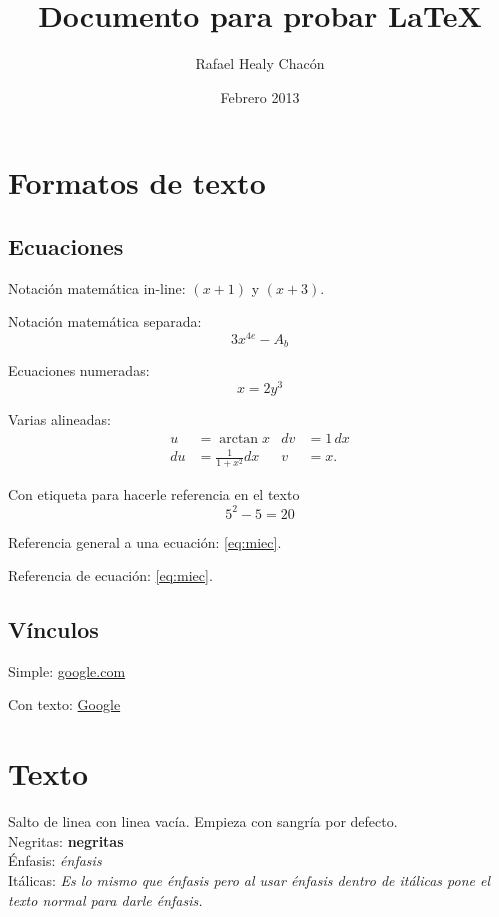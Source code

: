 \documentclass[12pt, a4paper,twoside]{article} %
\title{Documento para probar \LaTeX}
\author{Rafael Healy Chacón}
\date{Febrero 2013}
\begin{document}
\maketitle

\clearpage
\tableofcontents
{}
\listoffigures
\listoftables

\clearpage
\section{Formatos de texto}
\subsection{Ecuaciones}
Notación matemática in-line: $(x+1)$ y $(x+3)$.

Notación matemática separada: $$3x^{4e} - A_b$$ 

Ecuaciones numeradas: 
\begin{equation} 
x=2y^3 
\end{equation}

Varias alineadas:
\begin{align}
u &= \arctan x & dv &= 1 \, dx
\\ du &= \frac{1}{1 + x^2} dx & v &= x.
\end{align}

Con etiqueta para hacerle referencia en el texto
\begin{equation} \label{eq:miec}
5^2 - 5 = 20
\end{equation}

Referencia general a una ecuación: \ref{eq:miec}. 

Referencia de ecuación: \eqref{eq:miec}.

\subsection{Vínculos}
Simple: \url{google.com}

Con texto: \href{google.com}{Google}

\section{Texto}
Salto de linea con linea vacía. Empieza con sangría por defecto.\\
Negritas: \textbf{negritas}\\
Énfasis: \emph{énfasis}\\
Itálicas: \textit{Es lo mismo que énfasis pero al usar énfasis \emph{dentro} de itálicas pone el texto normal para darle énfasis.}
\end{document}
